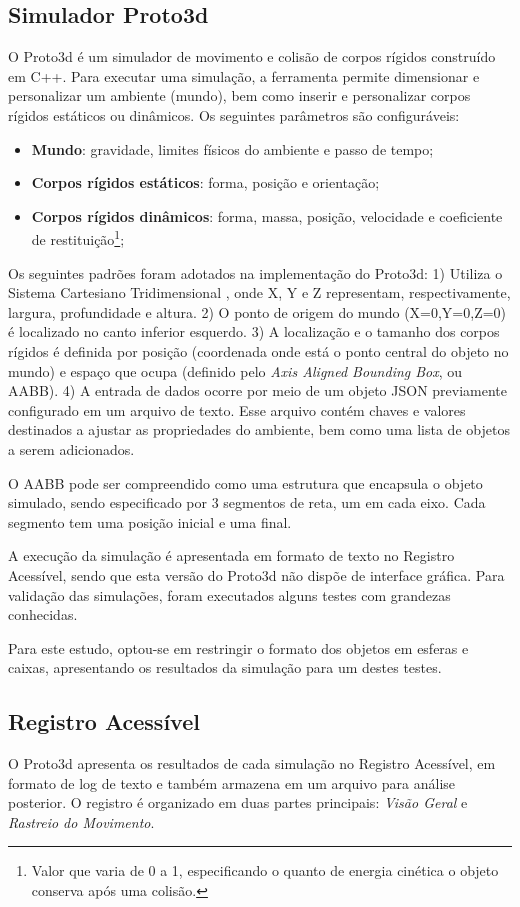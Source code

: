 \documentclass[12pt]{article}
\begin{document}
\subsection{Simulador Proto3d}
O Proto3d é um simulador de movimento e colisão de corpos rígidos construído em C++. Para executar uma simulação, a ferramenta permite dimensionar e personalizar um ambiente (mundo), bem como inserir e personalizar corpos rígidos estáticos ou dinâmicos. Os seguintes parâmetros são configuráveis:
\begin{itemize}
	\item \textbf{Mundo}: gravidade, limites físicos do ambiente e passo de tempo;
	\item \textbf{Corpos rígidos estáticos}: forma, posição e orientação;
	\item \textbf{Corpos rígidos dinâmicos}: forma, massa, posição, velocidade e coeficiente de restituição\footnote{Valor que varia de 0 a 1, especificando o quanto de energia cinética o objeto conserva após uma colisão.};
\end{itemize}
%
Os seguintes padrões foram adotados na implementação do Proto3d: 1) Utiliza o Sistema Cartesiano Tridimensional \cite{thibaut2004proyecto}, onde X, Y e Z representam, respectivamente, largura, profundidade e altura. 2) O ponto de origem do mundo (X=0,Y=0,Z=0) é localizado no canto inferior esquerdo. 3) A localização e o tamanho dos corpos rígidos é definida por posição (coordenada onde está o ponto central do objeto no mundo) e espaço que ocupa (definido pelo \textit{Axis Aligned Bounding Box}, ou AABB). 4) A entrada de dados ocorre por meio de um objeto JSON previamente configurado em um arquivo de texto. Esse arquivo contém chaves e valores destinados a ajustar as propriedades do ambiente, bem como uma lista de objetos a serem adicionados.

O AABB pode ser compreendido como uma estrutura que encapsula o objeto simulado, sendo especificado por 3 segmentos de reta, um em cada eixo. Cada segmento tem uma posição inicial e uma final.

A execução da simulação é apresentada em formato de texto no Registro Acessível, sendo que esta versão do Proto3d não dispõe de interface gráfica. Para validação das simulações, foram executados alguns testes com grandezas conhecidas. 

Para este estudo, optou-se em restringir o formato dos objetos em esferas e caixas, apresentando os resultados da simulação para um destes testes.

\subsection{Registro Acessível}
O Proto3d apresenta os resultados de cada simulação no Registro Acessível, em formato de log de texto e também armazena em um arquivo para análise posterior. O registro é organizado em duas partes principais: \emph{Visão Geral} e \emph{Rastreio do Movimento}.
\end{document}
